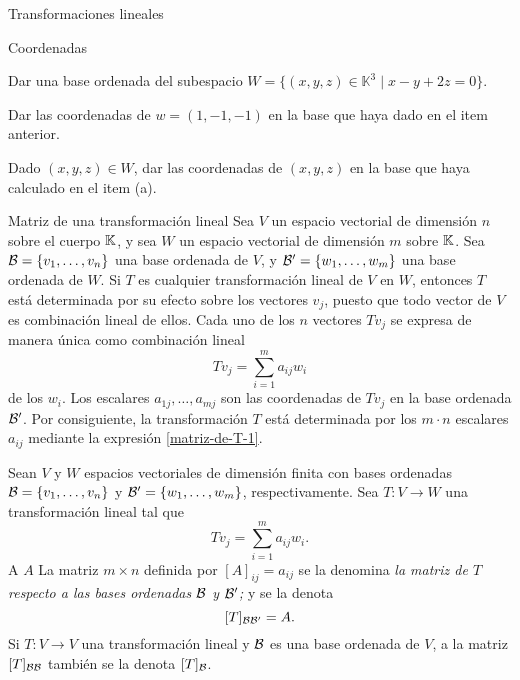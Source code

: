 \begin{chapter}{Transformaciones lineales}
\begin{section}{Coordenadas}
\begin{enumex}
        \item
        \begin{enumex}
            \item Dar una base ordenada del subespacio $W=\{(x,y,z)\in\mathbb{K}^3\mid x-y+2z=0\}$.
            \item Dar las coordenadas de $w=(1,-1,-1)$ en la base que haya dado en el item anterior.
            \item Dado $(x,y,z)\in W$, dar las coordenadas de $(x,y,z)$ en la base que haya calculado en el item (a).
        \end{enumex}
    \end{enumex}
    
    \end{section}


        \begin{section}{Matriz de una transformaci\'on lineal}\label{seccion-matriz-de-una-tl}
            Sea $V$ un espacio vectorial de dimensión $n$ sobre el cuerpo $\mathbb K$, y sea $W$ un espacio vectorial de dimensión $m$ sobre $\mathbb K$. Sea $\mathcal{B} = \{v_1,\ldots,v_n\}$ una base ordenada de $V$, y $\mathcal{B}' = \{w_1,\ldots,w_m\}$ una base ordenada de $W$. Si $T$ es cualquier 		transformación lineal de $V$ en $W$, entonces $T$ está determinada por su efecto sobre los vectores $v_j$, puesto que todo vector de $V$ es combinación lineal de ellos. Cada uno de los $n$ vectores $Tv_j$ se expresa de manera única 	como combinación lineal
            \begin{equation}\label{matriz-de-T-1}
                Tv_j = \sum_{i=1}^{m} a_{ij} w_i
            \end{equation}
            de los $w_i$. Los escalares $a_{1j},\ldots,a_{mj}$ son las coordenadas de $Tv_j$ en la base ordenada $\mathcal{B}'$. Por consiguiente, la transformación $T$ está determinada por los
            $m\cdot n$ escalares $a_{ij}$ mediante la expresión \eqref{matriz-de-T-1}. 
            
            \begin{definicion} Sean $V$ y $W$ espacios vectoriales de dimensión finita con bases ordenadas $\mathcal{B} = \{v_1,\ldots,v_n\}$  y $\mathcal{B}' = \{w_1,\ldots,w_m\}$, respectivamente. Sea $T: V \to W$ una transformación lineal tal que 
                \begin{equation*}\label{matriz-de-T-1}
                    Tv_j = \sum_{i=1}^{m} a_{ij} w_i.
                \end{equation*}
                A  $A$  La matriz $m \times n$  definida por $[A]_{ij} = a_{ij}$ se la  denomina \textit{la matriz de $T$ respecto a las bases ordenadas $\mathcal{B}$ y $\mathcal{B}'$;} y se la denota 
                $$
                [T]_{\mathcal{B} \mathcal{B}'} = A .
                $$
                Si $T: V \to V$ una transformación lineal y $\mathcal{B}$ es una base ordenada de $V$,  a la matriz $[T]_{\mathcal{B} \mathcal{B}}$ también se la denota $[T]_{\mathcal{B}}$.
            \end{definicion}
            

\end{section}
\end{chapter}
